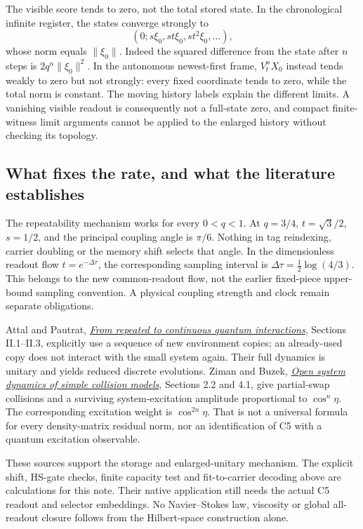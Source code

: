 \documentclass[11pt,a4paper]{article}
\begin{document}
The visible score tends to zero, not the total stored state. In the
chronological infinite register, the states converge strongly to
\[
 (0;s\xi_0,st\xi_0,st^2\xi_0,\ldots),
\]
whose norm equals $\|\xi_0\|$. Indeed the squared difference from the
state after $n$ steps is $2q^n\|\xi_0\|^2$. In the autonomous
newest-first frame, $V_t^nX_0$ instead tends weakly to zero but not
strongly: every fixed coordinate tends to zero, while the total norm
is constant. The moving history labels explain the different limits.
A vanishing visible readout is consequently not a full-state zero,
and compact finite-witness limit arguments cannot be applied to the
enlarged history without checking its topology.

\subsection{What fixes the rate, and what the literature establishes}
The repeatability mechanism works for every $0<q<1$. At $q=3/4$,
$t=\sqrt3/2$, $s=1/2$, and the principal coupling angle is $\pi/6$.
Nothing in tag reindexing, carrier doubling or the memory shift selects
that angle. In the dimensionless readout flow $t=e^{-\Delta\tau}$,
the corresponding sampling interval is
$\Delta\tau=\tfrac12\log(4/3)$. This belongs to the new common-readout
flow, not the earlier fixed-piece upper-bound sampling convention.
A physical coupling strength and clock remain separate obligations.

Attal and Pautrat,
\href{https://arxiv.org/abs/math-ph/0311002}{\emph{From repeated to continuous quantum interactions}},
Sections II.1--II.3, explicitly use a sequence of new environment copies;
an already-used copy does not interact with the small system again.
Their full dynamics is unitary and yields reduced discrete evolutions.
Ziman and Buzek,
\href{https://arxiv.org/abs/1006.2794}{\emph{Open system dynamics of simple collision models}},
Sections 2.2 and 4.1, give partial-swap collisions and a surviving
system-excitation amplitude proportional to $\cos^n\eta$.
The corresponding excitation weight is $\cos^{2n}\eta$.
That is not a universal formula for every density-matrix residual norm,
nor an identification of C5 with a quantum excitation observable.

These sources support the storage and enlarged-unitary mechanism.
The explicit shift, HS-gate checks, finite capacity test and
fit-to-carrier decoding above are calculations for this note. Their
native application still needs the actual C5 readout and selector
embeddings. No Navier--Stokes law, viscosity or global all-readout
closure follows from the Hilbert-space construction alone.
\end{document}
